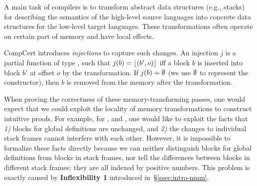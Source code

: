 A main task of compilers is to transform abstract data structures
(e.g., stacks) for describing the semantics of the high-level source
languages into concrete data structures for the low-level target
languages. These transformations often operate on certain part of
memory and have local effects.

CompCert introduces \emph{injections} to capture such changes. An
injection $j$ is a partial function of type
, such that $j(b) =
\lfloor (b',o) \rfloor$ iff a block $b$ is inserted into block $b'$ at offset
$o$ by the transformation. If $j(b) = \emptyset$ (we use $\emptyset$ to
represent the  constructor), then $b$ is removed from the
memory after the transformation.

When proving the correctness of these memory-transforming passes, one
would expect that we could exploit the locality of memory
transformations to construct intuitive proofs. For example, for
,  and , one would
like to exploit the facts that \emph{1)} blocks for global definitions
are unchanged, and \emph{2)} the changes to individual stack frames
cannot interfere with each other. However, it is impossible to
formalize these facts directly because we can neither distinguish
blocks for global definitions from blocks in stack frames, nor tell
the differences between blocks in different stack frames: they are all
indexed by positive numbers. This problem is exactly caused by
\textbf{Inflexibility 1} introduced in~\S\ref{ssec:intro-nmm}.


